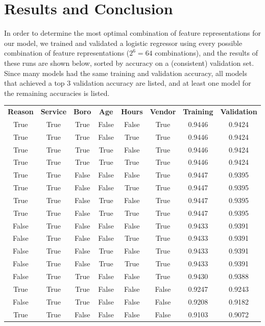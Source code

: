 \documentclass[11pt]{article}
\begin{document}
\newpage
\section{Results and Conclusion}
In order to determine the most optimal combination of feature representations for our model, we trained and validated a logistic regressor using every possible combination of feature representations ($2^6=64$ combinations), and the results of these runs are shown below, sorted by accuracy on a (consistent) validation set. Since many models had the same training and validation accuracy, all models that achieved a top 3 validation accuracy are listed, and at least one model for the remaining accuracies is listed.

\begin{table}[h]
\centering
\begin{tabular}{cccccc|cc}
\bf{Reason} & \bf{Service} & \bf{Boro} & \bf{Age} & \bf{Hours} & \bf{Vendor} & \bf{Training} & \bf{Validation} \\
True & True & True & False & False & True & 0.9446 & 0.9424 \\
True & True & True & False & True & True & 0.9446 & 0.9424 \\
True & True & True & True & False & True & 0.9446 & 0.9424 \\
True & True & True & True & True & True & 0.9446 & 0.9424 \\
True & True & False & False & False & True & 0.9447 & 0.9395 \\
True & True & False & False & True & True & 0.9447 & 0.9395 \\
True & True & False & True & False & True & 0.9447 & 0.9395 \\
True & True & False & True & True & True & 0.9447 & 0.9395 \\
False & True & False & False & False & True & 0.9433 & 0.9391 \\
False & True & False & False & True & True & 0.9433 & 0.9391 \\
False & True & False & True & False & True & 0.9433 & 0.9391 \\
False & True & False & True & True & True & 0.9433 & 0.9391 \\
False & True & True & False & False & True & 0.9430 & 0.9388 \\
True & True & True & False & False & False & 0.9247 & 0.9243 \\
False & True & True & False & False & False & 0.9208 & 0.9182 \\
True & True & False & False & False & False & 0.9103 & 0.9072 \\

\end{tabular}
\end{table}
\end{document}
